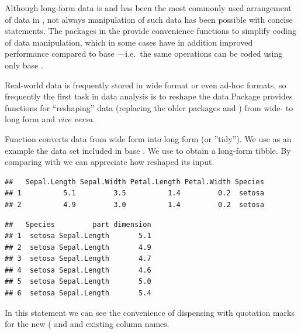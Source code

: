 \documentclass[krantz2]{krantz}\usepackage{knitr}%
\begin{document}
Although long-form data is and has been the most commonly used arrangement of data in \Rlang, not always manipulation of such data has been possible with concise \Rlang statements. The packages in the  provide convenience functions to simplify coding of data manipulation, which in some cases have in addition improved performance compared to base \Rlang---i.e.\ the same operations can be coded using only base \Rlang.

Real-world data is frequently stored in wide format or even ad-hoc formats, so frequently the first task in data analysis is to reshape the data.Package  provides functions for ``reshaping'' data (replacing the older packages  and ) from wide- to long form and \emph{vice versa}.


Function  converts data from wide form into long form (or ''tidy''). We use as an example the  data set included in base \Rlang. We use  to obtain a long-form tibble. By comparing  with  we can appreciate how  reshaped its input.
\begin{knitrout}\footnotesize
{}\color{fgcolor}\begin{kframe}
\begin{alltt}
 \hlstd{)}
\end{alltt}
\begin{verbatim}
##   Sepal.Length Sepal.Width Petal.Length Petal.Width Species
## 1          5.1         3.5          1.4         0.2  setosa
## 2          4.9         3.0          1.4         0.2  setosa
\end{verbatim}
\begin{alltt}
 \hlkwb{<-}      \hlopt{-}
\end{alltt}
\begin{verbatim}
##   Species         part dimension
## 1  setosa Sepal.Length       5.1
## 2  setosa Sepal.Length       4.9
## 3  setosa Sepal.Length       4.7
## 4  setosa Sepal.Length       4.6
## 5  setosa Sepal.Length       5.0
## 6  setosa Sepal.Length       5.4
\end{verbatim}
\end{kframe}
\end{knitrout}
In this statement we can see the convenience of dispensing with quotation marks for the new ( and  and existing  column names.
\end{document}
